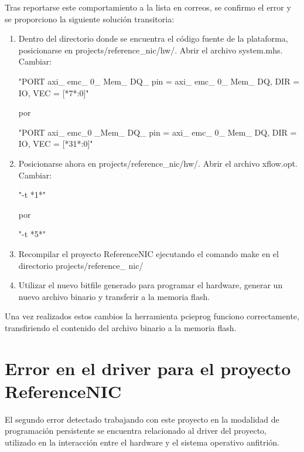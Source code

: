 Tras reportarse este comportamiento a la lista en correos\citep{NetFPGABetaMailing}, se confirmo el error y se proporciono la siguiente solución transitoria:

\begin{enumerate}
\item Dentro del directorio donde se encuentra el c\'odigo fuente de la plataforma, posicionarse en 
	  projects/reference\_nic/hw/. Abrir el archivo system.mhs.\\
	  Cambiar:
\begin{center}
	"PORT axi\_ emc\_ 0\_ Mem\_ DQ\_ pin = axi\_ emc\_ 0\_ Mem\_ DQ, DIR = IO, VEC = [*7*:0]"
\end{center}
por
\begin{center}
"PORT axi\_ emc\_0 \_Mem\_ DQ\_ pin = axi\_ emc\_ 0\_ Mem\_ DQ, DIR = IO, VEC = [*31*:0]"
\end{center}

\item Posicionarse ahora en projects/reference\_nic/hw/. Abrir el archivo xflow.opt.\\
	  Cambiar:
\begin{center}
"-t *1*"
\end{center}
por
\begin{center}
"-t *5*"
\end{center}

\item Recompilar el proyecto ReferenceNIC ejecutando el comando make en el directorio projects/reference\_ nic/

\item Utilizar el nuevo bitfile generado para programar el hardware, generar un nuevo archivo binario y transferir a la memoria flash.
\end{enumerate}

Una vez realizados estos cambios la herramienta pcieprog funciono correctamente, transfiriendo el contenido del archivo binario a la memoria flash.
 
\section{Error en el driver para el proyecto ReferenceNIC}
El segundo error detectado trabajando con este proyecto en la modalidad de programaci\'on persistente  se encuentra relacionado al driver del proyecto, utilizado en la interacción entre el hardware y el sistema operativo anfitrión.\\


